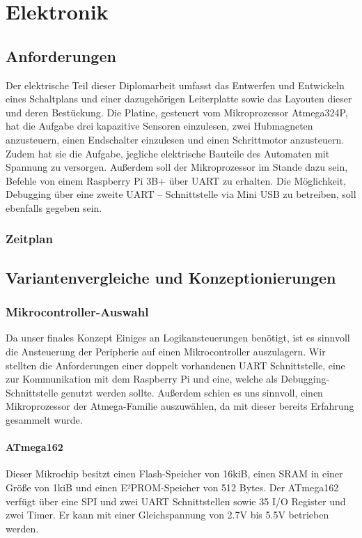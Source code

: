 \chapter{Elektronik}

\section{Anforderungen}

Der elektrische Teil dieser Diplomarbeit umfasst das Entwerfen und Entwickeln eines Schaltplans und einer dazugehörigen Leiterplatte sowie das Layouten dieser und deren Bestückung.
Die Platine, gesteuert vom Mikroprozessor Atmega324P, hat die Aufgabe drei kapazitive Sensoren einzulesen, zwei Hubmagneten anzusteuern, einen Endschalter einzulesen und einen Schrittmotor anzusteuern.
Zudem hat sie die Aufgabe, jegliche elektrische Bauteile des Automaten mit Spannung zu versorgen.
Außerdem soll der Mikroprozessor im Stande dazu sein, Befehle von einem Raspberry Pi 3B+ über UART zu erhalten.
Die Möglichkeit, Debugging über eine zweite UART – Schnittstelle via Mini USB zu betreiben, soll ebenfalls gegeben sein.

\subsection{Zeitplan}

\section{Variantenvergleiche und Konzeptionierungen}
\subsection{Mikrocontroller-Auswahl}
Da unser finales Konzept Einiges an Logikansteuerungen benötigt, ist es sinnvoll die Ansteuerung der Peripherie auf einen Mikrocontroller auszulagern.
Wir stellten die Anforderungen einer doppelt vorhandenen UART Schnittstelle, eine zur Kommunikation mit dem Raspberry Pi und eine, welche als Debugging-Schnittstelle genutzt werden sollte.
Außerdem schien es uns sinnvoll, einen Mikroprozessor der Atmega-Familie auszuwählen, da mit dieser bereits Erfahrung gesammelt wurde.
\subsubsection{ATmega162}
Dieser Mikrochip besitzt einen Flash-Speicher von 16kiB, einen SRAM in einer Größe von 1kiB und einen E²PROM-Speicher von 512 Bytes.
Der ATmega162 verfügt über eine SPI und zwei UART Schnittstellen sowie 35 I/O Register und zwei Timer.
Er kann mit einer Gleichspannung von 2.7V bis 5.5V betrieben werden.
